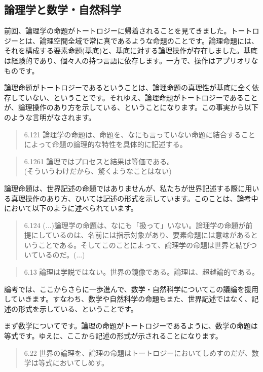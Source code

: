 \documentclass[11pt,a4paper]{jsbook}
\begin{document}
\subsection{論理学と数学・自然科学}
前回、論理学の命題がトートロジーに帰着されることを見てきました。トートロジーとは、論理空間全域で常に真であるような命題のことです。論理命題には、それを構成する要素命題(基底)と、基底に対する論理操作が存在しました。基底は経験的であり、個々人の持つ言語に依存します。一方で、操作はアプリオリなものです。
\par
論理命題がトートロジーであるということは、論理命題の真理性が基底に全く依存していない、ということです。それゆえ、論理命題がトートロジーであることが、論理操作のあり方を示している、ということになります。この事実から以下のような言明がなされます。
\begin{quote}
6.121 論理学の命題は、命題を、なにも言っていない命題に結合することによって命題の論理的な特性を具体的に記述する。
\end{quote}
\begin{quote}
6.1261 論理ではプロセスと結果は等価である。\\(そういうわけだから、驚くようなことはない)
\end{quote}
\par
論理命題は、世界記述の命題ではありませんが、私たちが世界記述する際に用いる真理操作のあり方、ひいては記述の形式を示しています。このことは、論考中において以下のように述べられています。
\begin{quote}
6.124 (...)論理学の命題は、なにも「扱って」いない。論理学の命題が前提にしているのは、名前には指示対象があり、要素命題には意味があるということである。そしてこのことによって、論理学の命題は世界と結びついているのだ。(...)
\end{quote}
\begin{quote}
6.13 論理は学説ではない。世界の鏡像である。論理は、超越論的である。
\end{quote}
\par
論考では、ここからさらに一歩進んで、数学・自然科学についてこの議論を援用していきます。すなわち、数学や自然科学の命題もまた、世界記述ではなく、記述の形式を示している、ということです。
\par
まず数学についてです。論理の命題がトートロジーであるように、数学の命題は等式です。ゆえに、ここから記述の形式が示されることになります。
\begin{quote}
6.22 世界の論理を、論理の命題はトートロジーにおいてしめすのだが、数学は等式においてしめす。
\end{quote}
\par
\end{document}
